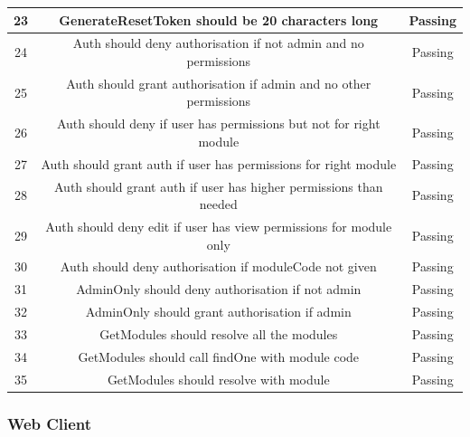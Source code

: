 \documentclass[a4paper,12pt]{article}
\begin{document}
\begin{tabular}{ |c|c|c| }
    			\hline
    			23 & GenerateResetToken should be 20 characters long & Passing\\
    			\hline
   				24 & Auth should deny authorisation if not admin and no permissions & Passing\\
    			\hline
   				25 & Auth should grant authorisation if admin and no other permissions & Passing\\
    			\hline
   				26 & Auth should deny if user has permissions but not for right module & Passing\\
    			\hline
   				27 & Auth should grant auth if user has permissions for right module & Passing\\
    			\hline
   				28 & Auth should grant auth if user has higher permissions than needed & Passing\\
    			\hline
   				29 & Auth should deny edit if user has view permissions for module only & Passing\\
    			\hline
   				30 & Auth should deny authorisation if moduleCode not given & Passing\\
    			\hline
   				31 & AdminOnly should deny authorisation if not admin & Passing\\
    			\hline
   				32 & AdminOnly should grant authorisation if admin & Passing\\
    			\hline
    			33 & GetModules should resolve all the modules & Passing\\
    			\hline
    			34 & GetModules should call findOne with module code & Passing\\
    			\hline
    			35 & GetModules should resolve with module & Passing\\
    			\hline
    		\end{tabular}
    		
    		\subsubsection{Web Client}
    		
\end{document}
